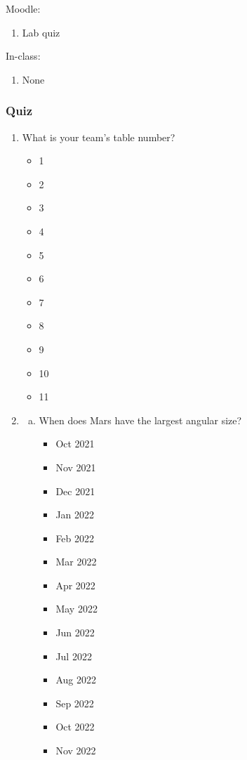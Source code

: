 \documentclass[12pt]{article}
\begin{document}
Moodle:
\begin{enumerate}
\item Lab quiz
\end{enumerate}

\noindent
In-class:
\begin{enumerate}
\item None
\end{enumerate}


\subsubsection{Quiz}

\begin{enumerate}
\item
What is your team's table number?
\begin{itemize}
    \item 1
    \item 2
    \item 3
    \item 4
    \item 5
    \item 6
    \item 7
    \item 8
    \item 9
    \item 10
    \item 11
\end{itemize}
\item
\begin{enumerate}[a.]
    \item When does Mars have the largest angular size?
    \begin{itemize}
        \item Oct 2021
        \item Nov 2021
        \item Dec 2021
        \item Jan 2022
        \item Feb 2022
        \item Mar 2022
        \item Apr 2022
        \item May 2022
        \item Jun 2022
        \item Jul 2022
        \item Aug 2022
        \item Sep 2022
        \item Oct 2022
        \item Nov 2022

\end{itemize}
\end{enumerate}
\end{enumerate}
\end{document}
